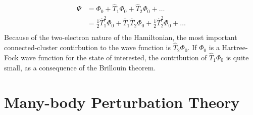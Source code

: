 \documentclass[a4paper, 11pt, notitlepage, english]{article}
\newcommand{\op}[1]{\hat{#1}}
\begin{document}
\begin{align*}
\Psi &= \Phi_0 + \op{T}_1\Phi_0 + \op{T}_2\Phi_0 +  \ldots \\		
&= \frac{1}{2}\op{T}_1^2\Phi_0 + \op{T}_1\op{T}_2\Phi_0 + \frac{1}{2}\op{T}_2^2\Phi_0+  \ldots \\		
\end{align*}
Because of the two-electron nature of the Hamiltonian, the most important connected-cluster contirbution to the wave function is $\op{T}_2 \Phi_0$. If $\Phi_0$ is a Hartree-Fock wave function for the state of interested, the contribution of $\op{T}_1\Phi_0$ is quite small, as a consequence of the Brillouin theorem.


\section*{Many-body Perturbation Theory}
\end{document}
